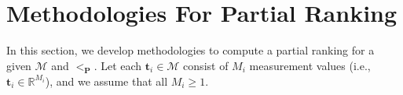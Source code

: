 \documentclass[acmsmall,screen, review]{acmart}
\begin{document}




\section{Methodologies For Partial Ranking}
\label{sec3:met}

 In this section, we develop methodologies to compute a partial ranking for a given $\mathcal{M}$ and $<_{\mathbf{P}}$. Let each $\mathbf{t}_i \in \mathcal{M}$ consist of $M_i$ measurement values (i.e.,  $\mathbf{t}_i \in \mathbb{R}^{M_i}$), and we assume that all $M_i \ge 1$. 
\end{document}
